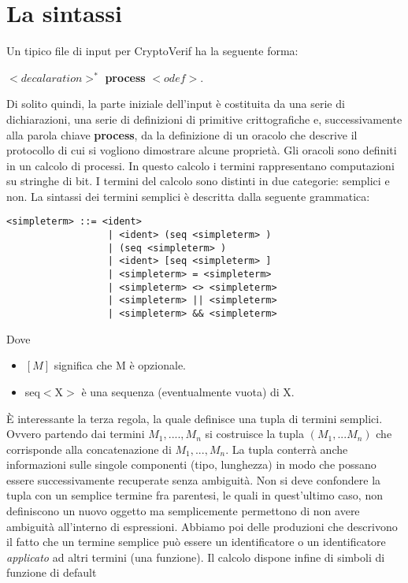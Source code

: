 \documentclass[a4paper,openright,twoside,12pt]{report}
\begin{document}
\section{La sintassi}
Un tipico file di input per CryptoVerif ha la seguente forma: \begin{center}
                                                               $<decalaration>^{*}$ \textbf{process} $<odef>$.
                                                              \end{center}
Di solito quindi, la parte iniziale dell'input \`e costituita da una serie di dichiarazioni, una serie di definizioni di primitive crittografiche e, successivamente alla parola chiave \textbf{process}, 
da la definizione di un oracolo che descrive il protocollo di cui si vogliono dimostrare alcune propriet\`a.
Gli oracoli sono definiti in un calcolo di processi. In questo calcolo i termini rappresentano computazioni su stringhe di bit.
I termini del calcolo sono distinti in due categorie: semplici e non. La sintassi dei termini semplici \`e descritta dalla seguente grammatica:
\begin{verbatim}
<simpleterm> ::= <ident>
                  | <ident> (seq <simpleterm> )
                  | (seq <simpleterm> )
                  | <ident> [seq <simpleterm> ]
                  | <simpleterm> = <simpleterm>
                  | <simpleterm> <> <simpleterm>
                  | <simpleterm> || <simpleterm>
                  | <simpleterm> && <simpleterm>
\end{verbatim}
Dove
\begin{itemize}
 \item $[M]$ significa che M \`e opzionale.
 \item seq$<$X$>$ \`e una sequenza (eventualmente vuota) di X.
\end{itemize}
\`E interessante la terza regola, la quale definisce una tupla di termini semplici. Ovvero partendo dai termini $M_1,....,M_n$ si costruisce la tupla $(M_1,...M_n)$ che corrisponde
alla concatenazione di $M_1,...,M_n$. La tupla conterr\`a anche informazioni sulle singole componenti (tipo, lunghezza) in modo che possano essere successivamente 
recuperate senza ambiguit\`a.
Non si deve confondere la tupla con un semplice termine fra parentesi, le quali in quest'ultimo caso, non definiscono un nuovo oggetto ma semplicemente 
permettono di non avere ambiguit\`a all'interno di espressioni. Abbiamo poi delle produzioni che descrivono il fatto che un termine semplice pu\`o essere
un identificatore o un identificatore \emph{applicato} ad altri termini (una funzione). Il calcolo dispone infine di simboli di funzione di default
\end{document}
